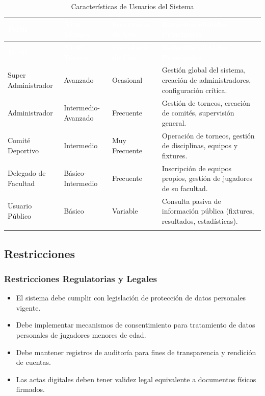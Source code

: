\documentclass[12pt,a4paper]{article}
\begin{document}
\begin{longtable}{|>{\raggedright\arraybackslash}p{2.8cm}|>{\raggedright\arraybackslash}p{3cm}|>{\raggedright\arraybackslash}p{2.5cm}|>{\raggedright\arraybackslash}p{5cm}|}
\hline
\rowcolor{headercolor}
\textcolor{white}{\textbf{Perfil}} & \textcolor{white}{\textbf{Nivel Técnico}} & \textcolor{white}{\textbf{Frecuencia de Uso}} & \textcolor{white}{\textbf{Responsabilidades Principales}} \\
\hline
\endfirsthead
\hline
\rowcolor{headercolor}
\textcolor{white}{\textbf{Perfil}} & \textcolor{white}{\textbf{Nivel Técnico}} & \textcolor{white}{\textbf{Frecuencia de Uso}} & \textcolor{white}{\textbf{Responsabilidades Principales}} \\
\hline
\endhead
\hline
\endlastfoot

Super Administrador & Avanzado & Ocasional & Gestión global del sistema, creación de administradores, configuración crítica. \\
\hline
\rowcolor{rowgray}
Administrador & Intermedio-Avanzado & Frecuente & Gestión de torneos, creación de comités, supervisión general. \\
\hline
Comité Deportivo & Intermedio & Muy Frecuente & Operación de torneos, gestión de disciplinas, equipos y fixtures. \\
\hline
\rowcolor{rowgray}
Delegado de Facultad & Básico-Intermedio & Frecuente & Inscripción de equipos propios, gestión de jugadores de su facultad. \\
\hline
Usuario Público & Básico & Variable & Consulta pasiva de información pública (fixtures, resultados, estadísticas). \\
\hline
\caption{Características de Usuarios del Sistema}
\end{longtable}

\subsection{Restricciones}

\subsubsection{Restricciones Regulatorias y Legales}

\begin{itemize}[noitemsep]
    \item El sistema debe cumplir con legislación de protección de datos personales vigente.
    \item Debe implementar mecanismos de consentimiento para tratamiento de datos personales de jugadores menores de edad.
    \item Debe mantener registros de auditoría para fines de transparencia y rendición de cuentas.
    \item Las actas digitales deben tener validez legal equivalente a documentos físicos firmados.
\end{itemize}
\end{document}

